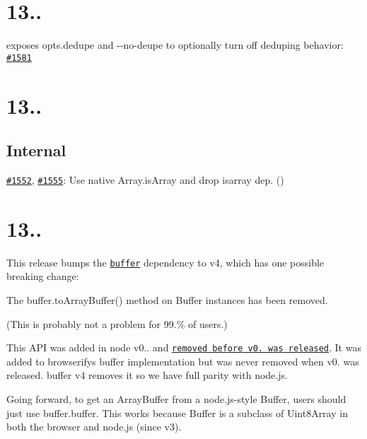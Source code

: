\section*{13..}

exposes {\ttfamily opts.\+dedupe} and {\ttfamily -\/-\/no-\/deupe} to optionally turn off deduping behavior\+: \href{https://github.com/substack/node-browserify/pull/1581}{\tt \#1581}

\section*{13..}

\subsection*{Internal}

\href{https://github.com/substack/node-browserify/pull/1552}{\tt \#1552}, \href{https://github.com/substack/node-browserify/pull/1555}{\tt \#1555}\+: Use native {\ttfamily Array.\+is\+Array} and drop {\ttfamily isarray} dep. (\href{https://github.com/kt3k}{\tt })

\section*{13..}

This release bumps the \href{https://www.npmjs.com/package/buffer}{\tt {\ttfamily buffer}} dependency to v4, which has one possible breaking change\+:


\begin{DoxyItemize}
\item The {\ttfamily buffer.\+to\+Array\+Buffer()} method on {\ttfamily Buffer} instances has been removed.
\end{DoxyItemize}

(This is probably not a problem for 99.\% of users.)

This A\+PI was added in node v0.. and \href{https://github.com/nodejs/node-v0.x-archive/issues/7609#issuecomment-42903457}{\tt removed before v0. was released}. It was added to browserify\textquotesingle{}s {\ttfamily buffer} implementation but was never removed when v0. was released. {\ttfamily buffer} v4 removes it so we have full parity with node.\+js.

Going forward, to get an {\ttfamily Array\+Buffer} from a node.\+js-\/style {\ttfamily Buffer}, users should just use {\ttfamily buffer.\+buffer}. This works because {\ttfamily Buffer} is a subclass of {\ttfamily Uint8\+Array} in both the browser and node.\+js (since v3).

